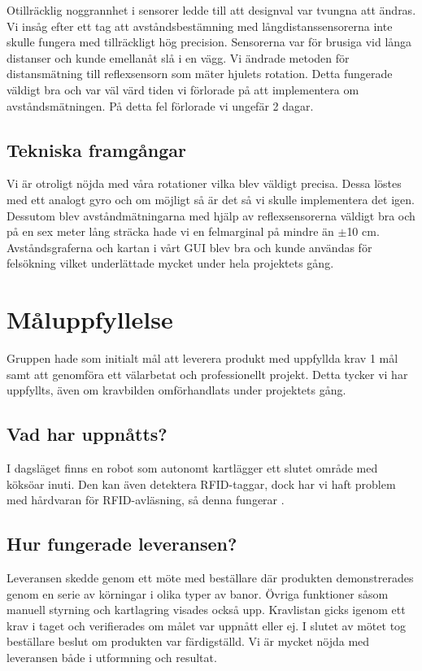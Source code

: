 \documentclass[a4paper,12pt,fleqn]{article}
\begin{document}
Otillräcklig noggrannhet i sensorer ledde till att designval var tvungna att ändras.
Vi insåg efter ett tag att avståndsbestämning med långdistanssensorerna inte skulle fungera med tillräckligt hög precision. Sensorerna var för brusiga vid långa distanser och kunde emellanåt slå i en vägg. Vi ändrade metoden för distansmätning till reflexsensorn som mäter hjulets rotation. Detta fungerade väldigt bra och var väl värd tiden vi förlorade på att implementera om avståndsmätningen. På detta fel förlorade vi ungefär 2 dagar.

\subsection{Tekniska framgångar}
Vi är otroligt nöjda med våra rotationer vilka blev väldigt precisa.
Dessa löstes med ett analogt gyro och om möjligt så är det så vi skulle implementera det igen. Dessutom blev avståndmätningarna med hjälp av reflexsensorerna väldigt bra och på en sex meter lång sträcka hade vi en felmarginal på mindre än $\pm$10 cm. Avståndsgraferna och kartan i vårt GUI blev bra och kunde användas för felsökning vilket underlättade mycket under hela projektets gång. 

\newpage
\section{Måluppfyllelse}
Gruppen hade som initialt mål att leverera produkt med uppfyllda krav 1 mål samt att genomföra ett välarbetat och professionellt projekt. Detta tycker vi har uppfyllts, även om kravbilden omförhandlats under projektets gång. 

\subsection{Vad har uppnåtts?}
I dagsläget finns en robot som autonomt kartlägger ett slutet område med köksöar inuti. Den kan även detektera RFID-taggar, dock har vi haft problem med hårdvaran för RFID-avläsning, så denna fungerar . 

\subsection{Hur fungerade leveransen?}
Leveransen skedde genom ett möte med beställare där produkten demonstrerades genom en serie av körningar i olika typer av banor. Övriga funktioner såsom manuell styrning och kartlagring visades också upp. Kravlistan gicks igenom ett krav i taget och verifierades om målet var uppnått eller ej. I slutet av mötet tog beställare beslut om produkten var färdigställd. Vi är mycket nöjda med leveransen både i utformning och resultat.
\end{document}
